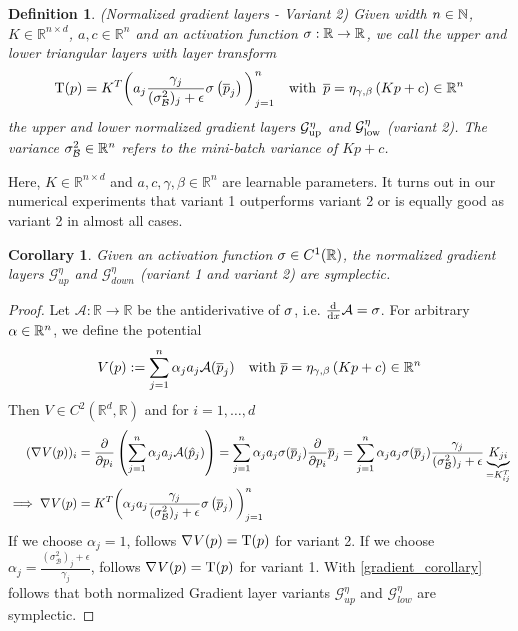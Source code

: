 \documentclass[twoside,a4paper]{article}
\newtheorem{definition}{Definition}
\newtheorem{corollary}{Corollary}
\begin{document}
\begin{definition}\label{def_norm_gradient_layers_2}
	(Normalized gradient layers - Variant 2)
	Given width $n \in \mathbb{N}$, $K \in \mathbb{R}^{n \times d}$, $a,c \in \mathbb{R}^n$ and
	an activation function $\sigma : \mathbb{R} \to \mathbb{R}$,
	we call the upper and lower triangular layers with layer transform
	\begin{equation*}
		\mathrm{T}(p) = K^T \bigg( a_j \frac{\gamma_j}{(\sigma^2_\mathcal{B})_j + \epsilon}
		\sigma \left( \overline{p}_j \right) \bigg)_{j=1}^n
		\quad \text{with } \, \overline{p} = \eta_{\gamma, \beta} \left( Kp + c \right) \in \mathbb{R}^n
	\end{equation*}
	the upper and lower normalized gradient layers 
	$\mathcal{G}_{\text{up}}^{\eta}$ and $\mathcal{G}_{\text{low}}^{\eta}$ (variant 2).
	The variance $\sigma^2_\mathcal{B} \in \mathbb{R}^n$ refers to the mini-batch variance of $Kp+c$.
\end{definition}

Here, $K \in \mathbb{R}^{n \times d}$ and $a,c, \gamma, \beta \in \mathbb{R}^n$
are learnable parameters.
It turns out in our numerical experiments that variant 1 outperforms
variant 2 or is equally good as variant 2 in almost all cases.

\begin{corollary}\label{cor_norm_gradient_layers_symp}
	Given an activation function $\sigma \in C^1(\mathbb{R})$,
	the normalized gradient layers $\mathcal{G}^{\eta}_{up}$ and $\mathcal{G}^{\eta}_{down}$
	(variant 1 and variant 2) are symplectic.
\end{corollary}
\begin{proof}
	Let $\mathcal{A}: \mathbb{R} \to \mathbb{R}$ be the antiderivative of $\sigma$, 
	i.e. $\frac{\mathrm{d}^{}}{\mathrm{d}x} \mathcal{A} = \sigma$. For arbitrary $\alpha \in \mathbb{R}^n$, we define the potential
	\begin{equation*}
		V(p) := \sum_{j=1}^n \alpha_j a_j \mathcal{A}(\overline{p}_j)
		\quad \text{with } \overline{p} = \eta_{\gamma, \beta} \left( Kp + c \right) \in \mathbb{R}^n
	\end{equation*}
	Then $V \in C^2(\mathbb{R}^d, \mathbb{R})$ and for $i=1, \dots, d$
	\begin{align*}
		(\nabla_{}{V(p)})_i &= \frac{\partial }{\partial p_i} \left( \sum_{j=1}^n \alpha_j a_j \mathcal{A}(\hat{p}_j) \right)
		= \sum_{j=1}^n \alpha_j a_j \sigma(\overline{p}_j) \frac{\partial }{\partial p_i} \overline{p}_j
		= \sum_{j=1}^n \alpha_j a_j \sigma(\overline{p}_j)
		\frac{\gamma_j}{(\sigma^2_\mathcal{B})_j + \epsilon} \underbrace{K_{ji}}_{=K^T_{ij}} \\
		\implies
		\nabla_{}{V(p)}
		&= K^T \bigg( \alpha_j a_j \frac{\gamma_j}{(\sigma^2_\mathcal{B})_j + \epsilon}
		\sigma \left( \overline{p}_j \right) \bigg)_{j=1}^n
	\end{align*}
	If we choose $\alpha_j = 1$, follows $\nabla_{}{V(p)} = \mathrm{T}(p)$ for variant 2.
	If we choose $\alpha_j = \frac{(\sigma^2_\mathcal{B})_j + \epsilon}{\gamma_j}$,
	follows $\nabla_{}{V(p)} = \mathrm{T}(p)$ for variant 1.
	With \cref{gradient_corollary} follows that both normalized Gradient layer variants
	$\mathcal{G}_{up}^\eta$ and $\mathcal{G}_{low}^\eta$ are symplectic.
\end{proof}
\end{document}
